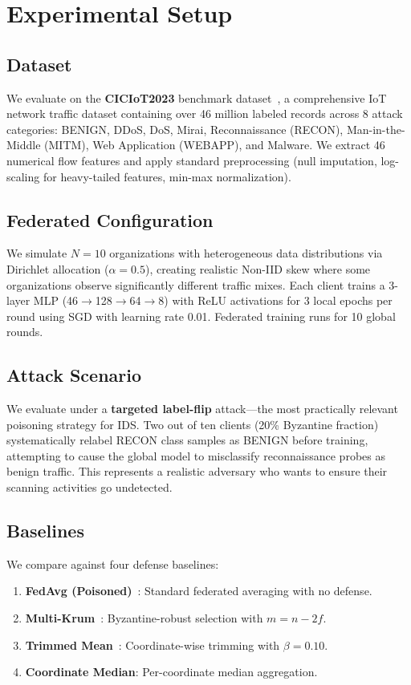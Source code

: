 \documentclass[conference]{IEEEtran}
\begin{document}
\section{Experimental Setup}
\label{sec:setup}

\subsection{Dataset}
We evaluate on the \textbf{CICIoT2023} benchmark dataset~\cite{neto2023ciciot}, a comprehensive IoT network traffic dataset containing over 46 million labeled records across 8 attack categories: BENIGN, DDoS, DoS, Mirai, Reconnaissance (RECON), Man-in-the-Middle (MITM), Web Application (WEBAPP), and Malware. We extract 46 numerical flow features and apply standard preprocessing (null imputation, log-scaling for heavy-tailed features, min-max normalization).

\subsection{Federated Configuration}
We simulate $N = 10$ organizations with heterogeneous data distributions via Dirichlet allocation ($\alpha = 0.5$), creating realistic Non-IID skew where some organizations observe significantly different traffic mixes. Each client trains a 3-layer MLP (46$\to$128$\to$64$\to$8) with ReLU activations for 3 local epochs per round using SGD with learning rate 0.01. Federated training runs for 10 global rounds.

\subsection{Attack Scenario}
We evaluate under a \textbf{targeted label-flip} attack---the most practically relevant poisoning strategy for IDS. Two out of ten clients (20\% Byzantine fraction) systematically relabel RECON class samples as BENIGN before training, attempting to cause the global model to misclassify reconnaissance probes as benign traffic. This represents a realistic adversary who wants to ensure their scanning activities go undetected.

\subsection{Baselines}
We compare against four defense baselines:
\begin{enumerate}
    \item \textbf{FedAvg (Poisoned)}~\cite{mcmahan2017fedavg}: Standard federated averaging with no defense.
    \item \textbf{Multi-Krum}~\cite{blanchard2017krum}: Byzantine-robust selection with $m = n - 2f$.
    \item \textbf{Trimmed Mean}~\cite{yin2018trimmedmean}: Coordinate-wise trimming with $\beta = 0.10$.
    \item \textbf{Coordinate Median}: Per-coordinate median aggregation.
\end{enumerate}
\end{document}
